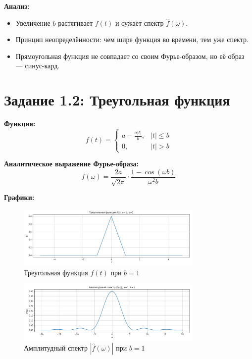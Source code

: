 \textbf{Анализ:}

\begin{itemize}
    \item Увеличение $b$ растягивает $f(t)$ и сужает спектр $\hat{f}(\omega)$.
    \item Принцип неопределённости: чем шире функция во времени, тем уже спектр.
    \item Прямоугольная функция не совпадает со своим Фурье-образом, но её образ — синус-кард.
\end{itemize}


\section*{Задание 1.2: Треугольная функция}

\textbf{Функция:}
\[
f(t) = 
\begin{cases}
a - \frac{a |t|}{b}, & |t| \le b \\
0, & |t| > b
\end{cases}
\]

\textbf{Аналитическое выражение Фурье-образа:}
\[
\hat{f}(\omega) = \frac{2a}{\sqrt{2\pi}} \cdot \frac{1 - \cos(\omega b)}{\omega^2 b}
\]

\textbf{Графики:}

\begin{figure}[h!]
    \centering
    \includegraphics[width=0.8\textwidth]{triangle_function_b1.png}
    \caption{Треугольная функция $f(t)$ при $b=1$}
\end{figure}

\begin{figure}[h!]
    \centering
    \includegraphics[width=0.8\textwidth]{triangle_spectrum_b1.png}
    \caption{Амплитудный спектр $|\hat{f}(\omega)|$ при $b=1$}
\end{figure}

